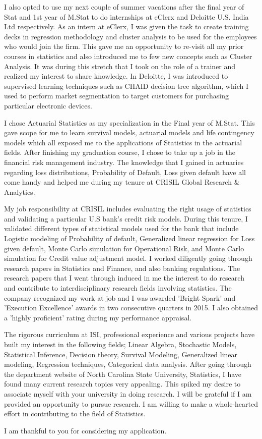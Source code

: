 \documentclass[12pt]{article}
\begin{document}
I also opted to use my next couple of summer vacations after the final year of Stat and 1st year of M.Stat to do internships at eClerx and Deloitte U.S. India Ltd respectively. As an intern at eClerx, I was given the task to create training decks in regression methodology and cluster analysis to be used for the employees who would join the firm. This gave me an opportunity to re-visit all my prior courses in statistics and also introduced me to few new concepts such as Cluster Analysis. It was during this stretch that I took on the role of a trainer and realized my interest to share knowledge. In Deloitte, I was introduced to supervised learning techniques such as CHAID decision tree algorithm, which I used to perform market segmentation to target customers for purchasing particular electronic devices. 

I chose Actuarial Statistics as my specialization in the Final year of M.Stat. This gave scope for me to learn survival models, actuarial models and life contingency models which all exposed me to the applications of Statistics in the actuarial fields. After finishing my graduation course, I chose to take up a job in the financial risk management industry.  The knowledge that I gained in actuaries regarding loss distributions, Probability of Default, Loss given default have all come handy and helped me during my tenure at CRISIL Global Research & Analytics. 

My job responsibility at CRISIL includes evaluating the right usage of statistics and validating a particular U.S bank's credit risk models. During this tenure, I validated different types of statistical models used for the bank that include Logistic modeling of Probability of default, Generalized linear regression for Loss given default, Monte Carlo simulation for Operational Risk, and Monte Carlo simulation for Credit value adjustment model. I worked diligently going through research papers in Statistics and Finance, and also banking regulations. The research papers that I went through induced in me the interest to do research and contribute to interdisciplinary research fields involving statistics. The company recognized my work at job and I was awarded 'Bright Spark' and 'Execution Excellence' awards in two consecutive quarters in 2015. I also obtained a 'highly proficient' rating during my performance appraisal.

The rigorous curriculum at ISI, professional experience and various projects have built my interest in the following fields; Linear Algebra, Stochastic Models, Statistical Inference, Decision theory, Survival Modeling, Generalized linear modeling, Regression techniques, Categorical data analysis. After going through the department website of North Carolina State University, Statistics, I have found many current research topics very appealing. This spiked my desire to associate myself with your university in doing research. I will be grateful if I am provided an opportunity to pursue research. I am willing to make a whole-hearted effort in contributing to the field of Statistics. 

I am thankful to you for considering my application.
\end{document}
